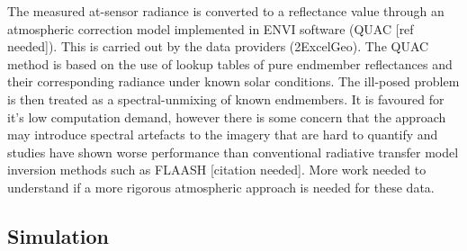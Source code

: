 \documentclass[10pt,a4paper,final,onecolumn]{article}
\begin{document}
The measured at-sensor radiance is converted to a reflectance value through an  atmospheric correction model implemented in ENVI software (QUAC [ref needed]). This is carried out by the data providers (2ExcelGeo). The QUAC method is based on the use of lookup tables of pure endmember reflectances and their corresponding radiance under known solar conditions. The ill-posed problem is then treated as a spectral-unmixing of known endmembers. It is favoured for it's low computation demand, however there is some concern that the approach may introduce spectral artefacts to the imagery that are hard to quantify and studies have shown worse performance than conventional radiative transfer model inversion methods such as FLAASH [citation needed]. More work needed to understand if a more rigorous atmospheric approach is needed for these data.

\subsection{Simulation}
\end{document}
